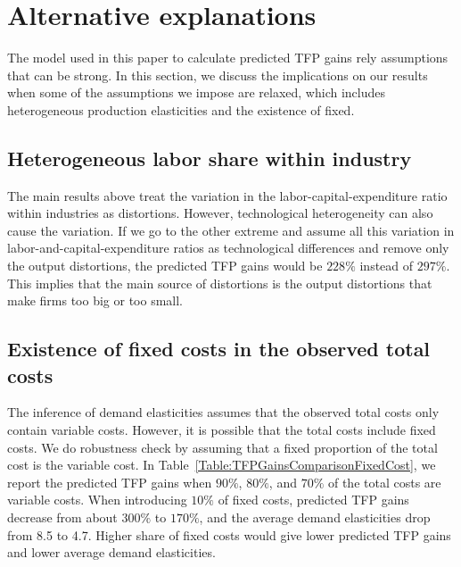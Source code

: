 \documentclass[12pt]{article}
\begin{document}
\section{Alternative explanations}
The model used in this paper to calculate predicted TFP gains rely assumptions that can be strong. In this section, we discuss the implications on our results when some of the assumptions we impose are relaxed, which includes heterogeneous production elasticities and the existence of fixed.

\subsection{Heterogeneous labor share within industry}
\label{Subsec: heteroAlpha}
The main results above treat the variation in the labor-capital-expenditure ratio within industries as distortions. However, technological heterogeneity can also cause the variation. If we go to the other extreme and assume all this variation in labor-and-capital-expenditure ratios as technological differences and remove only the output distortions, the predicted TFP gains would be $228\%$ instead of $297\%$. This implies that the main source of distortions is the output distortions that make firms too big or too small.

\subsection{Existence of fixed costs in the observed total costs}
\label{Subsec:fixedCost}
The inference of demand elasticities assumes that the observed total costs only contain variable costs. However, it is possible that the total costs include fixed costs. We do robustness check by assuming that a fixed proportion of the total cost is the variable cost. In Table~\ref{Table:TFPGainsComparisonFixedCost}, we report the predicted TFP gains when $90\%$, $80\%$, and $70\%$ of the total costs are variable costs. When introducing $10\%$ of fixed costs, predicted TFP gains decrease from about $300\%$ to $170\%$, and the average demand elasticities drop from 8.5 to 4.7. Higher share of fixed costs would give lower predicted TFP gains and lower average demand elasticities.


\end{document}
